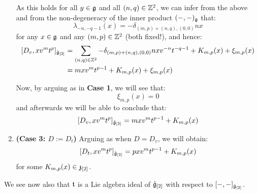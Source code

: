 \begin{remark}
\begin{enumerate}
                    As this holds for all $y \in \mathfrak{g}$ and all $(n, q) \in \mathbb{Z}^2$, we can infer from the above and from the non-degeneracy of the inner product $(-, -)_{\mathfrak{g}}$ that:
                        $$\lambda_{-n, -q - 1}(x) = -\delta_{(m, p) + (n, q), (0, 0)} n x$$
                    for any $x \in \mathfrak{g}$ and any $(m, p) \in \mathbb{Z}^2$ (both fixed!), and hence:
                        $$
                            \begin{aligned}
                                [D_v, x v^m t^p]_{\hat{\g}_{[2]}} & = \sum_{(n, q) \in \Z^2} -\delta_{(m, p) + (n, q), (0, 0)} n x v^{-n} t^{-q - 1} + K_{m, p}(x) + \xi_{m, p}(x)
                                \\
                                & = m x v^m t^{p - 1} + K_{m, p}(x) + \xi_{m, p}(x)
                            \end{aligned}
                        $$

                    Now, by arguing as in \textbf{Case 1}, we will see that:
                        $$\xi_{m, p}(x) = 0$$
                    and afterwards we will be able to conclude that:
                        $$[D_v, x v^m t^p]_{\hat{\mathfrak{g}}_{[2]}} = m x v^m t^{p - 1} + K_{m, p}(x)$$
                    \item \textbf{(Case 3: $D := D_t$)} Arguing as when $D = D_v$, we will obtain:
                        $$[D_t, x v^m t^p]_{\hat{\mathfrak{g}}_{[2]}} = p x v^m t^{p - 1} + K_{m, p}(x)$$
                    for some $K_{m, p}(x) \in \mathfrak{z}_{[2]}$.
                \end{enumerate}
            \end{remark}
            \begin{remark}
                We see now also that $\mathfrak{t}$ is a Lie algebra ideal of $\hat{\mathfrak{g}}_{[2]}$ with respect to $[-, -]_{\hat{\mathfrak{g}}_{[2]}}$.
            \end{remark}

